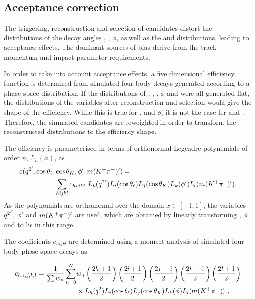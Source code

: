 \subsection{Acceptance correction}
\label{sec:kpimm:acceptance}

The triggering, reconstruction and selection of candidates distort the distributions of the decay angles \ctl, \ctk, $\phi$, as well as the \qsq and \mkpi distributions, leading to acceptance effects. The dominant sources of bias derive from the track momentum and impact parameter requirements. 

In order to take into account acceptance effects, a five dimensional efficiency function is determined from simulated four-body \BdToKpimm decays generated according to a phase space distribution. If the distributions of \qsq, \ctl, \ctk, $\phi$ and \mkpi were all generated flat, the distributions of the variables after reconstruction and selection would give the shape of the efficiency.  While this is true for \ctl, \ctk and $\phi$, it is not the case for \qsq and \mkpi. Therefore, the simulated candidates are reweighted in order to transform the reconstructed distributions to the efficiency shape.

The efficiency is parameterised in terms of orthonormal Legendre polynomials of order $n$, $L_n(x)$, as
\begin{equation}
\begin{split}
\varepsilon({q^2}',\cos{\theta_\ell},&\cos{\theta_K},\phi',m({{K}^+}{{\pi}^-})') = \\
& \sum_{hijkl} c_{hijkl}~L_{h}({q^2}')L_{i}(\cos{\theta_\ell})L_{j}(\cos{\theta_K})L_{k}(\phi')L_{l}(m({{K}^+}{{\pi}^-})').
 \end{split}
 \label{eqn:legendre}
\end{equation}
As the polynomials are orthonormal over the domain $x\in[-1,1]$, the variables ${q^2}'$, $\phi'$ and $m({{K}^+}{{\pi}^-})'$ are used, which are obtained by linearly transforming \qsq, $\phi$ and \mkpi to lie in this range.

The coefficients $c_{hijkl}$ are determined using a moment analysis of simulated four-body \BdToKpimm phase-space decays as

\begin{equation}
   \begin{split}
     c_{h,i,j,k,l} = \frac{1}{\sum w_{n}}\sum_{n=0}^{N}&w_{n}\left(\frac{2h+1}{2}\right)\left(\frac{2i+1}{2}\right)\left(\frac{2j+1}{2}\right)\left(\frac{2k+1}{2}\right)\left(\frac{2l+1}{2}\right)\\
     &\times L_{h}({q^2})L_{i}(\cos{\theta_\ell})L_{j}(\cos{\theta_K})L_{k}(\phi)L_{l}(m({{K}^+}{{\pi}^-}))~,
     \end{split}
 \end{equation}

